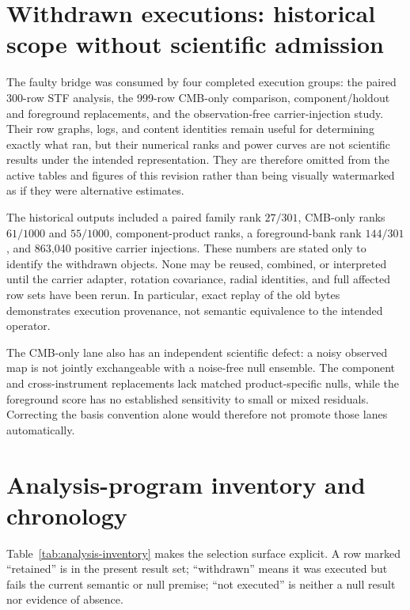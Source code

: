 \documentclass[11pt,a4paper]{article}
\begin{document}
\fi

\section{Withdrawn executions: historical scope without scientific admission}

The faulty bridge was consumed by four completed execution groups: the paired
300-row STF analysis, the 999-row CMB-only comparison, component/holdout and
foreground replacements, and the observation-free carrier-injection study.
Their row graphs, logs, and content identities remain useful for determining
exactly what ran, but their numerical ranks and power curves are not scientific
results under the intended representation.  They are therefore omitted from
the active tables and figures of this revision rather than being visually
watermarked as if they were alternative estimates.

The historical outputs included a paired family rank $27/301$, CMB-only ranks
$61/1000$ and $55/1000$, component-product ranks, a foreground-bank rank
$144/301$, and 863,040 positive carrier injections.  These numbers are stated
only to identify the withdrawn objects.  None may be reused, combined, or
interpreted until the carrier adapter, rotation covariance, radial identities,
and full affected row sets have been rerun.  In particular, exact replay of the
old bytes demonstrates execution provenance, not semantic equivalence to the
intended operator.

The CMB-only lane also has an independent scientific defect: a noisy observed
map is not jointly exchangeable with a noise-free null ensemble.  The component
and cross-instrument replacements lack matched product-specific nulls, while
the foreground score has no established sensitivity to small or mixed
residuals.  Correcting the basis convention alone would therefore not promote
those lanes automatically.

\section{Analysis-program inventory and chronology}
\label{sec:analysis-inventory}

Table~\ref{tab:analysis-inventory} makes the selection surface explicit.  A
row marked ``retained'' is in the present result set; ``withdrawn'' means it
was executed but fails the current semantic or null premise; ``not executed''
is neither a null result nor evidence of absence.
\end{document}
